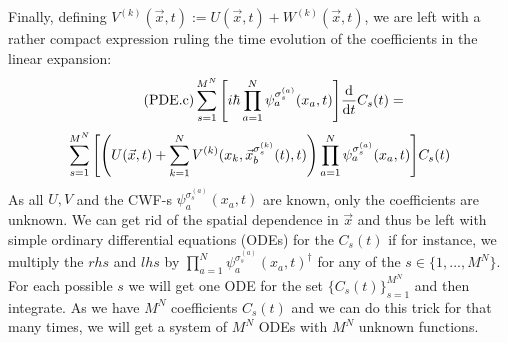 \documentclass[11pt, a4paper]{article} %
\begin{document}
Finally, defining $V^{(k)}(\vec{x},t):=U(\vec{x},t)+W^{(k)}(\vec{x},t)$, we are left with a rather compact expression ruling the time evolution of the coefficients in the linear expansion:
\begin{equation}\label{PDE.c}\tag{PDE.c}
\sum_{s=1}^{M^N} \qty[i\hbar \prod_{a=1}^N  \psi_a^{\sigma_s^{(a)}}(x_a,t)] \dv{}{t}C_s(t) = 
\end{equation}
$$
\sum_{s=1}^{M^N} \qty[\qty( U(\vec{x},t)+\sum_{k=1}^N V^{(k)}(x_k, \vec{x}^{\sigma_s^{(k)}}_b(t),t))\prod_{a=1}^N \psi_a^{\sigma_s^{(a)}}(x_a,t)]C_s(t)
$$
As all $U, V$ and the CWF-s $\psi_a^{\sigma_s^{(a)}}(x_a,t)$ are known, only the coefficients are unknown. We can get rid of the spatial dependence in $\vec{x}$ and thus be left with simple ordinary differential equations (ODEs) for the $C_s(t)$ if for instance, we multiply the $rhs$ and $lhs$ by $\prod_{a=1}^N \psi_a^{\sigma_s^{(a)}}(x_a,t)^\dagger$ for any of the $s\in \{1,...,M^N\}$. For each possible $s$ we will get one ODE for the set $\{C_s(t)\}_{s=1}^{M^N}$ and then integrate. As we have $M^N$ coefficients $C_s(t)$ and we can do this trick for that many times, we will get a system of $M^N$ ODEs with $M^N$ unknown functions. 
\end{document}
